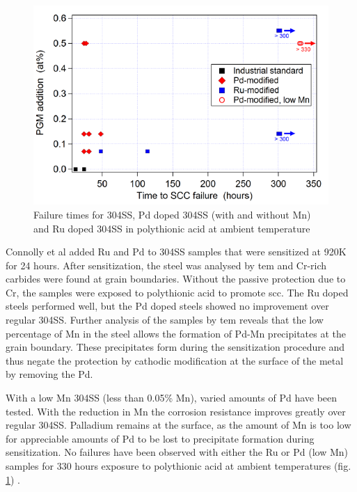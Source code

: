 \begin{figure}
\centering
\begin{minipage}{.80\linewidth}
\centering
    \includegraphics[width=.95\linewidth]{chapters/austenitic_steels_in_nuclear/images/pgmfailure.png}
    \caption{Failure times for 304SS, Pd doped 304SS (with and without Mn) and Ru doped 304SS in polythionic acid at ambient temperature\cite{scrstainless}}
    \label{fig:pgmfailuretimes}
\end{minipage}
\end{figure}

Connolly et al added Ru and Pd to \gls{304SS} samples that were sensitized at 920K for 24 hours\cite{scrstainless}.  After sensitization, the steel was analysed by \acrshort{tem} and Cr-rich carbides were found at grain boundaries.  Without the passive protection due to Cr, the samples were exposed to polythionic acid to promote \acrshort{scc}.  The Ru doped steels performed well, but the Pd doped steels showed no improvement over regular 304SS.  Further analysis of the samples by \acrshort{tem} reveals that the low percentage of Mn in the steel allows the formation of Pd-Mn precipitates at the grain boundary\cite{scrstainless}.  These precipitates form during the sensitization procedure and thus negate the protection by cathodic modification at the surface of the metal by removing the Pd.

With a low Mn 304SS (less than 0.05\% Mn), varied amounts of Pd have been tested.  With the reduction in Mn the corrosion resistance improves greatly over regular 304SS.  Palladium remains at the surface, as the amount of Mn is too low for appreciable amounts of Pd to be lost to precipitate formation during sensitization.  No failures have been observed with either the Ru or Pd (low Mn) samples for 330 hours exposure to polythionic acid at ambient temperatures (fig. \ref{fig:pgmfailuretimes}) \cite{scrstainless}.

